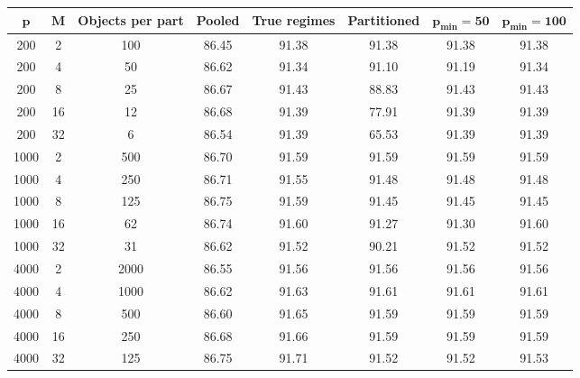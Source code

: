 \begin{tabular}{@{}cccccccc@{}}
\toprule
$\boldsymbol{p}$ & $\boldsymbol{M}$ & \textbf{Objects per part} & \textbf{Pooled} & \textbf{True regimes} & \textbf{Partitioned} & $\boldsymbol{p_{\min}=50}$ & $\boldsymbol{p_{\min}=100}$\\
\midrule
200 & 2 & 100 & 86.45 & 91.38 & 91.38 & 91.38 & 91.38\\
200 & 4 & 50 & 86.62 & 91.34 & 91.10 & 91.19 & 91.34\\
200 & 8 & 25 & 86.67 & 91.43 & 88.83 & 91.43 & 91.43\\
200 & 16 & 12 & 86.68 & 91.39 & 77.91 & 91.39 & 91.39\\
200 & 32 & 6 & 86.54 & 91.39 & 65.53 & 91.39 & 91.39\\
\midrule
1000 & 2 & 500 & 86.70 & 91.59 & 91.59 & 91.59 & 91.59\\
1000 & 4 & 250 & 86.71 & 91.55 & 91.48 & 91.48 & 91.48\\
1000 & 8 & 125 & 86.75 & 91.59 & 91.45 & 91.45 & 91.45\\
1000 & 16 & 62 & 86.74 & 91.60 & 91.27 & 91.30 & 91.60\\
1000 & 32 & 31 & 86.62 & 91.52 & 90.21 & 91.52 & 91.52\\
\midrule
4000 & 2 & 2000 & 86.55 & 91.56 & 91.56 & 91.56 & 91.56\\
4000 & 4 & 1000 & 86.62 & 91.63 & 91.61 & 91.61 & 91.61\\
4000 & 8 & 500 & 86.60 & 91.65 & 91.59 & 91.59 & 91.59\\
4000 & 16 & 250 & 86.68 & 91.66 & 91.59 & 91.59 & 91.59\\
4000 & 32 & 125 & 86.75 & 91.71 & 91.52 & 91.52 & 91.53\\
\bottomrule
\end{tabular}
